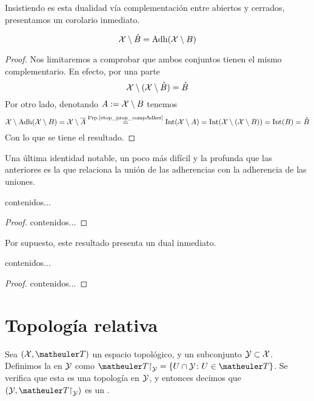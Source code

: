 Insistiendo es esta dualidad vía complementación entre abiertos y cerrados, presentamos un corolario inmediato.
\begin{cor}
	\label{etop_cor_compInter}
	\begin{equation*}
		\mathcal{X}\setminus\mathring{B}=\operatorname{\mathrm{Adh}}(\mathcal{X} \setminus B)
	\end{equation*}
\end{cor}
\begin{proof}
	Nos limitaremos a comprobar que ambos conjuntos tienen el mismo complementario. En efecto, por una parte
	\begin{equation*}
		\mathcal{X} \setminus (\mathcal{X} \setminus \mathring{B}) = \mathring{B}
	\end{equation*}
	Por otro lado, denotando $A:=\mathcal{X} \setminus B$ tenemos
	\begin{equation*}
		\mathcal{X} \setminus \operatorname{\mathrm{Adh}}(\mathcal{X} \setminus B)=\mathcal{X} \setminus \overline{A}\stackrel{\textrm{Prp.\ref{etop_prop_compAdher}}}{=}\operatorname{\mathrm{Int}}(\mathcal{X} \setminus A)=\operatorname{\mathrm{Int}}(\mathcal{X} \setminus (\mathcal{X} \setminus B))=\operatorname{\mathrm{Int}}(B)=\mathring{B}
	\end{equation*}
	Con lo que se tiene el resultado.
\end{proof}
Una última identidad notable, un poco más difícil y la profunda que las anteriores es la que relaciona la unión de las adherencias con la adherencia de las uniones.
\begin{prop}
	contenidos...
\end{prop}
\begin{proof}
	contenidos...
\end{proof}
Por supuesto, este resultado presenta un dual inmediato.
\begin{cor}
	contenidos...
\end{cor}
\begin{proof}
	contenidos...
\end{proof}




\section{Topología relativa}

\begin{defi}
	Sea $(\X,\T)$ un espacio topológico, y un subconjunto $\mathcal{Y}\subset\mathcal{X}$. Definimos la  en $\mathcal{Y}$ como $\T\restriction_\mc{Y} = \{U\cap\mc{Y}\colon U\in\T\}$. Se verifica que esta es una topología en $\mathcal{Y}$, y entonces decimos que $(\mc{Y},\T\restriction_\mc{Y})$ es un .
\end{defi}

